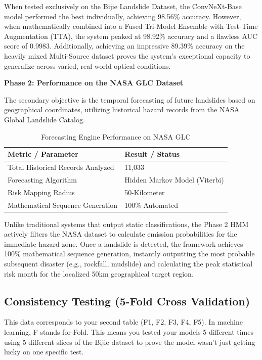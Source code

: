 \documentclass[11pt,a4paper]{article}
\begin{document}
When tested exclusively on the Bijie Landslide Dataset, the ConvNeXt-Base model performed the best individually, achieving 98.56\% accuracy. However, when mathematically combined into a Fused Tri-Model Ensemble with Test-Time Augmentation (TTA), the system peaked at 98.92\% accuracy and a flawless AUC score of 0.9983. Additionally, achieving an impressive 89.39\% accuracy on the heavily mixed Multi-Source dataset proves the system's exceptional capacity to generalize across varied, real-world optical conditions.

\vspace{0.5cm}
\textbf{Phase 2: Performance on the NASA GLC Dataset}

The secondary objective is the temporal forecasting of future landslides based on geographical coordinates, utilizing historical hazard records from the NASA Global Landslide Catalog.

\begin{table}[H]
\centering
\caption{Forecasting Engine Performance on NASA GLC}
\begin{tabular}{ll}
\toprule
\textbf{Metric / Parameter} & \textbf{Result / Status} \\
\midrule
Total Historical Records Analyzed & 11,033 \\
Forecasting Algorithm & Hidden Markov Model (Viterbi) \\
Risk Mapping Radius & 50-Kilometer \\
Mathematical Sequence Generation & 100\% Automated \\
\bottomrule
\end{tabular}
\end{table}

Unlike traditional systems that output static classifications, the Phase 2 HMM actively filters the NASA dataset to calculate emission probabilities for the immediate hazard zone. Once a landslide is detected, the framework achieves 100\% mathematical sequence generation, instantly outputting the most probable subsequent disaster (e.g., rockfall, mudslide) and calculating the peak statistical risk month for the localized 50km geographical target region.

\subsection{Consistency Testing (5-Fold Cross Validation)}
This data corresponds to your second table (F1, F2, F3, F4, F5). In machine learning, F stands for Fold. This means you tested your models 5 different times using 5 different slices of the Bijie dataset to prove the model wasn't just getting lucky on one specific test.
\end{document}
